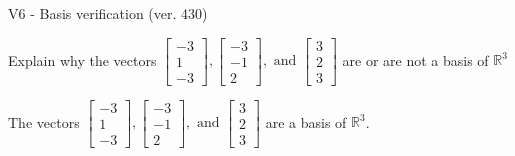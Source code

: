 \begin{exercise}
  \begin{exerciseTitle}V6 - Basis verification (ver. 430)\end{exerciseTitle}
  \begin{exerciseStatement}
    Explain why the vectors \(\left[\begin{array}{r}
-3 \\
1 \\
-3
\end{array}\right] , \left[\begin{array}{r}
-3 \\
-1 \\
2
\end{array}\right] , \text{ and } \left[\begin{array}{r}
3 \\
2 \\
3
\end{array}\right]\) are or are not a basis of \(\mathbb{R}^3\)	


  \end{exerciseStatement}
  \begin{exerciseAnswer}
   The vectors \(\left[\begin{array}{r}
-3 \\
1 \\
-3
\end{array}\right] , \left[\begin{array}{r}
-3 \\
-1 \\
2
\end{array}\right] , \text{ and } \left[\begin{array}{r}
3 \\
2 \\
3
\end{array}\right]\) 
  	 are  a basis of \(\mathbb{R}^3\).
  


  \end{exerciseAnswer}
\end{exercise}